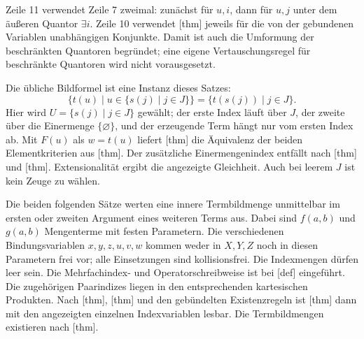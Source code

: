Zeile 11 verwendet Zeile 7 zweimal: zunächst für \(u,i\), dann für
\(u,j\) unter dem äußeren Quantor \(\exists i\). Zeile 10 verwendet
[thm] jeweils für die von der gebundenen
Variablen unabhängigen Konjunkte. Damit ist auch die Umformung der
beschränkten Quantoren begründet; eine eigene Vertauschungsregel für
beschränkte Quantoren wird nicht vorausgesetzt.

Die übliche Bildformel ist eine Instanz dieses Satzes:
\[
  \{t(u)\mid u\in\{s(j)\mid j\in J\}\}
    =\{t(s(j))\mid j\in J\}.
\]
Hier wird \(U=\{s(j)\mid j\in J\}\) gewählt; der erste Index läuft
über \(J\), der zweite über die Einermenge \(\{\varnothing\}\),
und der erzeugende Term hängt nur vom ersten Index ab. Mit
\(F(u)\) als \(w=t(u)\) liefert
[thm] die Äquivalenz der
beiden Elementkriterien aus
[thm]. Der zusätzliche
Einermengenindex entfällt nach
[thm] und
[thm]. Extensionalität ergibt die
angezeigte Gleichheit. Auch bei leerem \(J\) ist kein Zeuge zu wählen.

\medskip
Die beiden folgenden Sätze werten eine innere Termbildmenge unmittelbar
im ersten oder zweiten Argument eines weiteren Terms aus.
Dabei sind \(f(a,b)\) und \(g(a,b)\) Mengenterme mit festen Parametern.
Die verschiedenen Bindungsvariablen \(x,y,z,u,v,w\) kommen weder in
\(X,Y,Z\) noch in diesen Parametern frei vor; alle Einsetzungen sind
kollisionsfrei. Die Indexmengen dürfen leer sein.
Die Mehrfachindex- und Operatorschreibweise ist bei
[def] eingeführt.
Die zugehörigen Paarindizes liegen in den entsprechenden kartesischen
Produkten. Nach
[thm],
[thm]
und den gebündelten Existenzregeln ist
[thm] dann mit den angezeigten
einzelnen Indexvariablen lesbar. Die Termbildmengen existieren nach
[thm].


